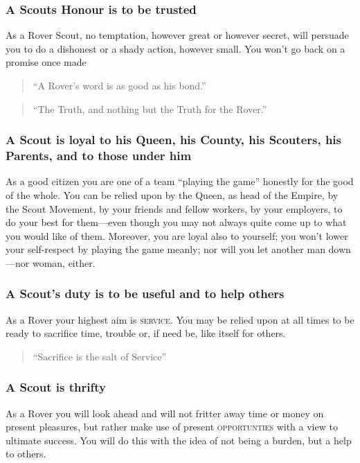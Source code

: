 \documentclass[11pt]{article}
\begin{document}
\subsubsection{A Scouts Honour is to be trusted}
As a Rover Scout, no temptation, however great or however secret, will persuade you to do a dishonest or a shady action, however small. You won't go back on a promise once made 

\begin{quote}
  ``A Rover's word is as good as his bond.''
\end{quote}
\begin{quote}
  ``The Truth, and nothing but the Truth for the Rover.''
\end{quote}

\subsubsection{A Scout is loyal to his Queen, his County, his Scouters, his Parents, and to those under him}
As a good citizen you are one of a team ``playing the game'' honestly for the good of the whole. You can be relied upon by the Queen, as head of the Empire, by the Scout Movement, by your friends and fellow workers, by your employers, to do your best for them---even though you may not always quite come up to what you would like of them. Moreover, you are loyal also to yourself; you won't lower your self-respect by playing the game meanly; nor will you let another man down---nor woman, either.

\subsubsection{A Scout's duty is to be useful and to help others}
As a Rover your highest aim is \textsc{service}. You may be relied upon at all times to be ready to sacrifice time, trouble or, if need be, like itself for others.

\begin{quote}
  ``Sacrifice is the salt of Service''
\end{quote}

\subsubsection{A Scout is thrifty}
As a Rover you will look ahead and will not fritter away time or money on present pleasures, but rather make use of present \textsc{opportunties} with a view to ultimate success. You will do this with the idea of not being a burden, but a help to others.
\end{document}
